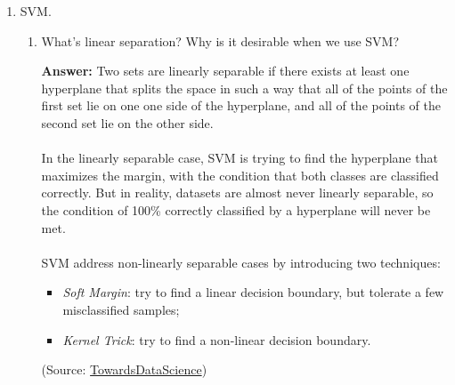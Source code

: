 \documentclass{article}
\newenvironment{QandA}{\begin{enumerate}[label=\arabic*.]}{\end{enumerate}}
\newenvironment{InnerQandA}{\begin{enumerate}[label=\roman*.]}{\end{enumerate}}
\newenvironment{answer}{\par\normalfont \textbf{Answer:}}{}
\begin{document}
\begin{QandA}
\begin{InnerQandA}
\begin{answer}
        \end{answer}

        \item What problems is gradient boosting good for?
        \begin{answer}
            Gradient Boosting is most useful with tabular/structured data, where interpretability is not required, and there are no strict latency constraints for model prediction time.
        \end{answer}
    \end{InnerQandA}

    \item SVM.
    \begin{InnerQandA}
        \item What’s linear separation? Why is it desirable when we use SVM?
        \begin{answer}
            Two sets are linearly separable if there exists at least one hyperplane that splits the space in such a way that all of the points of the first set lie on one one side of the hyperplane, and all of the points of the second set lie on the other side. \\\\
            In the linearly separable case, SVM is trying to find the hyperplane that maximizes the margin, with the condition that both classes are classified correctly. But in reality, datasets are almost never linearly separable, so the condition of 100\% correctly classified by a hyperplane will never be met.\\\\
            SVM address non-linearly separable cases by introducing two techniques:
            \begin{itemize}
                \item \textit{Soft Margin}: try to find a linear decision boundary, but tolerate a few misclassified samples;
                \item \textit{Kernel Trick}: try to find a non-linear decision boundary.
            \end{itemize}

            (Source: \href{https://towardsdatascience.com/support-vector-machine-simply-explained-fee28eba5496}{TowardsDataScience})
        \end{answer}


\end{InnerQandA}
\end{QandA}
\end{document}
